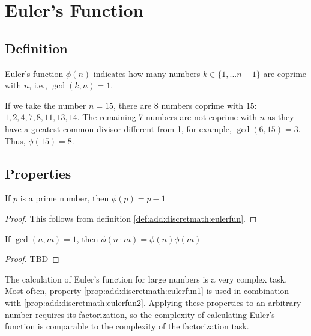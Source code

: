 \section{Euler's Function}

\subsection{Definition}
\begin{definition}
Euler's function $\phi\left(n\right)$ indicates how many numbers $k \in \{1, ... n-1\}$ are coprime with $n$, i.e., $\gcd\left(k, n\right) = 1$.
\label{def:add:discretmath:eulerfun}
\end{definition}

\begin{example}
  If we take the number $n=15$, there are 8 numbers coprime with $15$: 
  $1, 2, 4, 7, 8, 11, 13, 14$. The remaining 7 numbers are not coprime with $n$ as they have a greatest common divisor different from 1, for example, $\gcd\left(6, 15\right) = 3$.
  Thus, $\phi\left(15\right) = 8$. 
\end{example}

\subsection{Properties}

\begin{property}
If $p$ is a prime number, then $\phi(p) = p - 1$
\begin{proof}
This follows from definition \ref{def:add:discretmath:eulerfun}.
\end{proof}
\label{prop:add:discretmath:eulerfun1}
\end{property}

\begin{property}
If $\gcd\left(n, m\right) = 1$, then $\phi\left(n \cdot m\right) = \phi\left(n\right) \phi\left(m\right)$
\begin{proof}
TBD
\end{proof}
\label{prop:add:discretmath:eulerfun2}
\end{property}

\begin{remark}
\label{rem:add:discretmath:eulerfuncomplex}
The calculation of Euler's function for large numbers is a very complex task. Most often, property \ref{prop:add:discretmath:eulerfun1} is used in combination with \ref{prop:add:discretmath:eulerfun2}. Applying these properties to an arbitrary number requires its factorization, so the complexity of calculating Euler's function is comparable to the complexity of the factorization task. 
\end{remark}